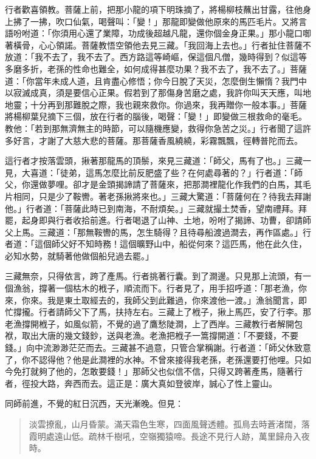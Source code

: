 行者歡喜領教。菩薩上前，把那小龍的項下明珠摘了，將楊柳枝蘸出甘露，往他身上拂了一拂，吹口仙氣，喝聲叫：「變！」那龍即變做他原來的馬匹毛片。又將言語吩咐道：「你須用心還了業障，功成後超越凡龍，還你個金身正果。」那小龍口啣著橫骨，心心領諾。菩薩教悟空領他去見三藏。「我回海上去也。」行者扯住菩薩不放道：「我不去了，我不去了。西方路這等崎嶇，保這個凡僧，幾時得到？似這等多磨多折，老孫的性命也難全，如何成得甚麼功果？我不去了，我不去了。」菩薩道：「你當年未成人道，且肯盡心修悟；你今日脫了天災，怎麼倒生懶惰？我門中以寂滅成真，須是要信心正果。假若到了那傷身苦磨之處，我許你叫天天應，叫地地靈；十分再到那難脫之際，我也親來救你。你過來，我再贈你一般本事。」菩薩將楊柳葉兒摘下三個，放在行者的腦後，喝聲：「變！」即變做三根救命的毫毛。教他：「若到那無濟無主的時節，可以隨機應變，救得你急苦之災。」行者聞了這許多好言，才謝了大慈大悲的菩薩。那菩薩香風繞繞，彩霧飄飄，徑轉普陀而去。

這行者才按落雲頭，揪著那龍馬的頂鬃，來見三藏道：「師父，馬有了也。」三藏一見，大喜道：「徒弟，這馬怎麼比前反肥盛了些？在何處尋著的？」行者道：「師父，你還做夢哩。卻才是金頭揭諦請了菩薩來，把那澗裡龍化作我們的白馬，其毛片相同，只是少了鞍轡。著老孫揪將來也。」三藏大驚道：「菩薩何在？待我去拜謝他。」行者道：「菩薩此時已到南海，不耐煩矣。」三藏就撮土焚香，望南禮拜。拜罷，起身即與行者收拾前進。行者喝退了山神、土地，吩咐了揭諦、功曹，卻請師父上馬。三藏道：「那無鞍轡的馬，怎生騎得？且待尋船渡過澗去，再作區處。」行者道：「這個師父好不知時務！這個曠野山中，船從何來？這匹馬，他在此久住，必知水勢，就騎著他做個船兒過去罷。」

三藏無奈，只得依言，跨了產馬。行者挑著行囊。到了澗邊。只見那上流頭，有一個漁翁，撐著一個枯木的栰子，順流而下。行者見了，用手招呼道：「那老漁，你來，你來。我是東土取經去的，我師父到此難過，你來渡他一渡。」漁翁聞言，即忙撐攏。行者請師父下了馬，扶持左右。三藏上了栰子，揪上馬匹，安了行李。那老漁撐開栰子，如風似箭，不覺的過了鷹愁陡澗，上了西岸。三藏教行者解開包袱，取出大唐的幾文錢鈔，送與老漁。老漁把栰子一篙撐開道：「不要錢，不要錢。」向中流渺渺茫茫而去。三藏甚不過意，只管合掌稱謝。行者道：「師父休致意了，你不認得他？他是此澗裡的水神。不曾來接得我老孫，老孫還要打他哩。只如今免打就夠了他的，怎敢要錢！」那師父也似信不信，只得又跨著產馬，隨著行者，徑投大路，奔西而去。這正是：廣大真如登彼岸，誠心了性上靈山。

同師前進，不覺的紅日沉西，天光漸晚。但見：
\begin{quote}
淡雲撩亂，山月昏蒙。滿天霜色生寒，四面風聲透體。孤鳥去時蒼渚闊，落霞明處遠山低。疏林千樹吼，空嶺獨猿啼。長途不見行人跡，萬里歸舟入夜時。
\end{quote}

